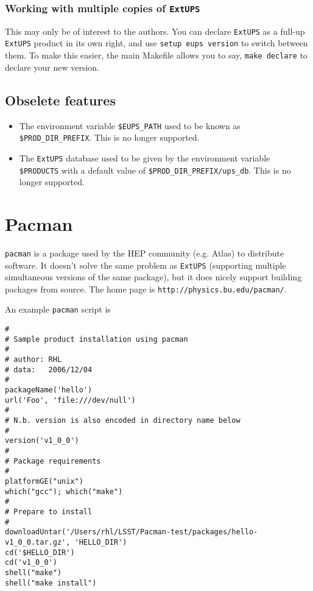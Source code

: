 \documentclass{article}
\newcommand{\code}[1]{\texttt{#1}}
\newcommand{\eups}{\code{ExtUPS}}
\newcommand{\pacman}{\code{pacman}}
\begin{document}
\subsubsection{Working with multiple copies of \eups}

This may only be of interest to the authors.  You can declare \eups{} as a full-up
\eups{} product in its own right, and use \code{setup eups version} to switch
between them.  To make this easier, the main Makefile allows you to say,
\code{make declare} to declare your new version.

\subsection{Obselete features}

\begin{itemize}
  \item The environment variable \code{\$EUPS\_PATH} used to be known
  as \code{\$PROD\_DIR\_PREFIX}. This is no longer supported.

  \item The \eups{} database used to be given by the environment variable \code{\$PRODUCTS}
    with a default value of \code{\$PROD\_DIR\_PREFIX/ups\_db}. This is no longer supported.
\end{itemize}

\section{Pacman}
\label{pacman}

\pacman{} is a package used by the HEP community (e.g. Atlas) to distribute
software.  It doesn't solve the same problem as \eups{} (supporting 
multiple simultaneous versions of the same package), but it does nicely
support building packages from source.  The home page is \code{http://physics.bu.edu/pacman/}.

An example \pacman{} script is
\begin{verbatim}
#
# Sample product installation using pacman
#
# author: RHL
# data:   2006/12/04
#
packageName('hello')
url('Foo', 'file:///dev/null')
#
# N.b. version is also encoded in directory name below
#
version('v1_0_0')
#
# Package requirements
#
platformGE("unix")
which("gcc"); which("make")
#
# Prepare to install
#
downloadUntar('/Users/rhl/LSST/Pacman-test/packages/hello-v1_0_0.tar.gz', 'HELLO_DIR')
cd('$HELLO_DIR')
cd('v1_0_0')
shell("make")
shell("make install")
\end{verbatim}
\end{document}
